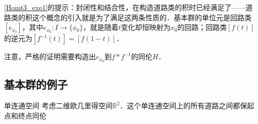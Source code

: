 \autoref{Homt3_exe1}的提示：封闭性和结合性，在构造道路类的积时已经满足了——道路类的积这个概念的引入就是为了满足这两条性质的．基本群的单位元是回路类$[e_{x_0}]$，其中$e_{x_0}: I\rightarrow\{x_0\}$，就是随着$t$变化却恒映射为$x_0$的回路；回路类$[f(t)]$的逆元为$[f^{-1}(t)]=[f(1-t)]$．

注意，严格的证明需要构造出$e_{x_0}$到$f*f^{-1}$的同伦$H$．

\subsection{基本群的例子}

\begin{example}{单连通空间}
考虑二维欧几里得空间$\mathbb{R}^2$．这个单连通空间上的所有道路之间都保起点和终点同伦
\end{example}





